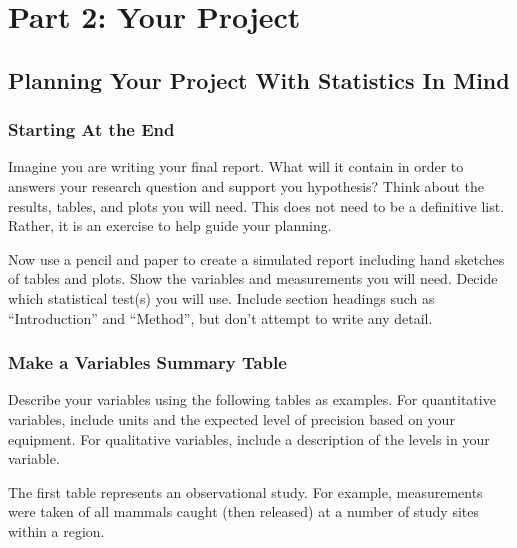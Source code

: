 \documentclass[
]{book}
\begin{document}
\part*{Part 2: Your Project}\label{part-part-2-your-project}

\chapter{Planning Your Project With Statistics In Mind}\label{planning-your-project-with-statistics-in-mind}

\section{Starting At the End}\label{starting-at-the-end}

Imagine you are writing your final report. What will it contain in order to answers your research question and support you hypothesis? Think about the results, tables, and plots you will need. This does not need to be a definitive list. Rather, it is an exercise to help guide your planning.

Now use a pencil and paper to create a simulated report including hand sketches of tables and plots. Show the variables and measurements you will need. Decide which statistical test(s) you will use. Include section headings such as ``Introduction'' and ``Method'', but don't attempt to write any detail.

\section{Make a Variables Summary Table}\label{make-a-variables-summary-table}

Describe your variables using the following tables as examples. For quantitative variables, include units and the expected level of precision based on your equipment. For qualitative variables, include a description of the levels in your variable.

The first table represents an observational study. For example, measurements were taken of all mammals caught (then released) at a number of study sites within a region.
\end{document}
